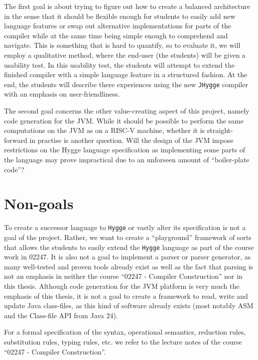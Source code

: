 The first goal is about trying to figure out how to create a balanced architecture in the sense that it should be flexible enough for students to easily add new language features or swap out alternative
implementations for parts of the compiler while at the same time being simple enough to comprehend and navigate. This is something that is hard to quantify, so to evaluate it, we will
employ a qualitative method, where the end-user (the students) will be given a usability test. In this usability test, the students will attempt to extend the finished compiler with
a simple language feature in a structured fashion. At the end, the students will describe there experiences using the new \texttt{JHygge} compiler with an emphasis on user-friendliness.

The second goal concerns the other value-creating aspect of this project, namely code generation for the JVM. While it should be possible to perform the same computations on the JVM
as on a RISC-V machine, whether it is straight-forward in practise is another question. Will the design of the JVM impose restrictions on the Hygge language specification as
implementing some parts of the language may prove impractical due to an unforseen amount of ``boiler-plate code''?

\section{Non-goals}

To create a successor language to \texttt{Hygge} or vastly alter its specification is not a goal of the project. Rather, we want to create a
``playground'' framework of sorts that allows the students to easily extend the \texttt{Hygge} language as part of the course work in 02247. 
It is also not a goal to implement a parser or parser generator, as many well-tested and proven tools already exist as well as the fact that
parsing is not an emphasis in neither the course ``02247 - Compiler Construction'' nor in this thesis. Although code generation for the JVM platform
is very much the emphasis of this thesis, it is not a goal to create a framework to read, write and update Java class-files, as this kind of
software already exists (most notably ASM and the Class-file API from Java 24).

For a formal specification of the syntax, operational semantics, reduction rules, substitution rules, typing rules, etc. we refer to the lecture
notes of the course ``02247 - Compiler Construction''.
